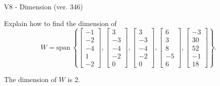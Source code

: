 \begin{exercise}
  \begin{exerciseTitle}V8 - Dimension (ver. 346)\end{exerciseTitle}
  \begin{exerciseStatement}
    Explain how to find the dimension of 
\[W=\mathrm{span}\ \left\{\left[\begin{array}{r}
-1 \\
-2 \\
-4 \\
1 \\
-2
\end{array}\right] , \left[\begin{array}{r}
3 \\
-3 \\
-4 \\
-2 \\
0
\end{array}\right] , \left[\begin{array}{r}
3 \\
-3 \\
-4 \\
-2 \\
0
\end{array}\right] , \left[\begin{array}{r}
6 \\
3 \\
8 \\
-5 \\
6
\end{array}\right] , \left[\begin{array}{r}
-3 \\
30 \\
52 \\
-1 \\
18
\end{array}\right]\right\}.\]



  \end{exerciseStatement}
  \begin{exerciseAnswer}
   The dimension of \(W\) is  \(2\).
  


  \end{exerciseAnswer}
\end{exercise}